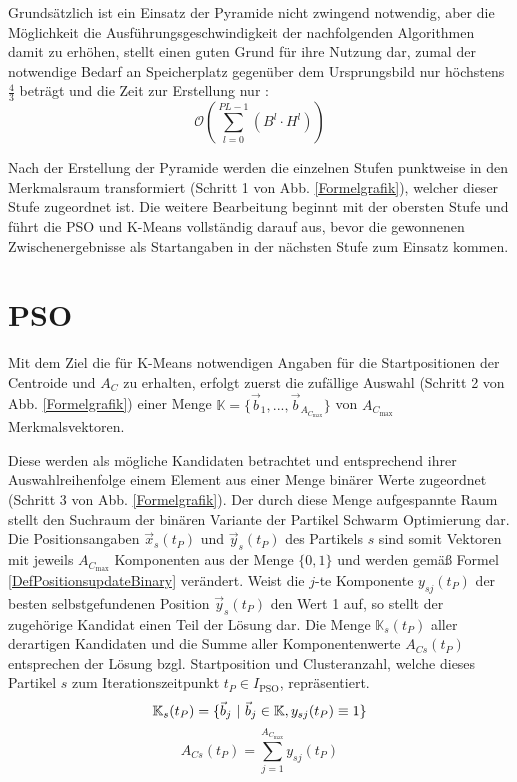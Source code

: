   Grundsätzlich ist ein Einsatz der Pyramide nicht zwingend notwendig, aber die Möglichkeit die Ausführungsgeschwindigkeit der nachfolgenden Algorithmen damit zu erhöhen, stellt einen guten Grund für ihre Nutzung dar, zumal der notwendige Bedarf an Speicherplatz gegenüber dem Ursprungsbild nur höchstens $\frac{4}{3}$ beträgt und die Zeit zur Erstellung nur \cite{Jaehne2002}:
  \begin{equation}\label{LaufzeitPyr}
    \mathcal O \left(\sum\limits_{l=0}^{PL-1}(B^l\cdot H^l)\right)
  \end{equation}
  
  Nach der Erstellung der Pyramide werden die einzelnen Stufen punktweise in den Merkmalsraum transformiert (Schritt 1 von Abb. \ref{Formelgrafik}), welcher dieser Stufe zugeordnet ist. Die weitere Bearbeitung beginnt mit der obersten Stufe und führt die PSO und K-Means vollständig darauf aus, bevor die gewonnenen Zwischenergebnisse als Startangaben in der nächsten Stufe zum Einsatz kommen.
  
\section{PSO}
  Mit dem Ziel die für K-Means notwendigen Angaben für die Startpositionen der Centroide und $A_C$ zu erhalten, erfolgt zuerst die zufällige Auswahl (Schritt 2 von Abb. \ref{Formelgrafik}) einer Menge $\mathbb{K}=\{\vec{b}_1, ..., \vec{b}_{A_{C_\textrm{max}}}\}$ von $A_{C_\textrm{max}}$ Merkmalsvektoren.
  
  Diese werden als mögliche Kandidaten betrachtet und entsprechend ihrer Auswahlreihenfolge einem Element aus einer Menge binärer Werte zugeordnet (Schritt 3 von Abb. \ref{Formelgrafik}).
  Der durch diese Menge aufgespannte Raum stellt den Suchraum der binären Variante der Partikel Schwarm Optimierung dar.
  Die Positionsangaben $\vec{x}_s(t_P)$ und $\vec{y}_s(t_P)$ des Partikels $s$ sind somit Vektoren mit jeweils $A_{C_\textrm{max}}$ Komponenten aus der Menge $\{0,1\}$ und werden gemäß Formel \ref{DefPositionsupdateBinary} verändert.
  Weist die $j$-te Komponente $y_{sj}(t_P)$ der besten selbstgefundenen Position $\vec{y}_s(t_P)$ den Wert 1 auf, so stellt der zugehörige Kandidat einen Teil der Lösung dar. Die Menge $\mathbb{K}_s(t_P)$ aller derartigen Kandidaten und die Summe aller Komponentenwerte $A_{Cs}(t_P)$ entsprechen der Lösung bzgl. Startposition und Clusteranzahl, welche dieses Partikel $s$ zum Iterationszeitpunkt $t_P\in I_\textrm{PSO}$, repräsentiert. \cite{Omran2006}
  \begin{equation}\label{PartikelLösungskandidaten}
    \mathbb{K}_s(t_P) = \{\vec{b}_j \textrm{\space}\vert\textrm{\space} \vec{b}_j\in\mathbb{K}, y_{sj}(t_P)\equiv 1 \}
  \end{equation}
  \begin{equation}\label{PartikelLösungsAC}
    A_{Cs}(t_P) = \sum\limits_{j=1}^{A_{C_\textrm{max}}} y_{sj}(t_P)
  \end{equation}

